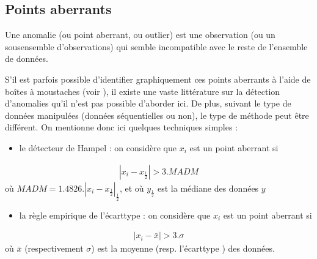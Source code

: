 \documentclass[letterpaper,10pt,french]{sphinxmanual}
\begin{document}
\subsection{Points aberrants}
\label{\detokenize{statsdescriptives:points-aberrants}}
\sphinxAtStartPar
Une anomalie (ou point aberrant, ou outlier) est une observation (ou un sous\sphinxhyphen{}ensemble d’observations) qui semble incompatible avec le reste de l’ensemble de données.

\sphinxAtStartPar
S’il est parfois possible d’identifier graphiquement ces points aberrants à l’aide de boîtes à moustaches (voir {\hyperref[\detokenize{statsdescriptives:boxplot}]{}}), il existe une vaste littérature sur la détection d’anomalies qu’il n’est pas possible d’aborder ici. De plus, suivant le type de données manipulées (données séquentielles ou non), le type de méthode peut être différent. On mentionne donc ici quelques techniques simples :
\begin{itemize}
\item {} 
\sphinxAtStartPar
le détecteur de Hampel : on considère que \(x_i\) est un point aberrant si

\end{itemize}
\begin{equation*}
\begin{split}|x_i-x_{\frac12}|>3.MADM\end{split}
\end{equation*}
\sphinxAtStartPar
où \(MADM = 1.4826.|x_i-x_{\frac12}|_\frac12\), et où \(y_{\frac12}\) est la médiane des données \(y\)
\begin{itemize}
\item {} 
\sphinxAtStartPar
la règle empirique de l’écart\sphinxhyphen{}type : on considère que \(x_i\) est un point aberrant si

\end{itemize}
\begin{equation*}
\begin{split}|x_i-\bar x|>3.\sigma\end{split}
\end{equation*}
\sphinxAtStartPar
où  \(\bar x\) (respectivement \(\sigma\)) est la moyenne (resp. l’écart\sphinxhyphen{}type ) des données.
\end{document}
